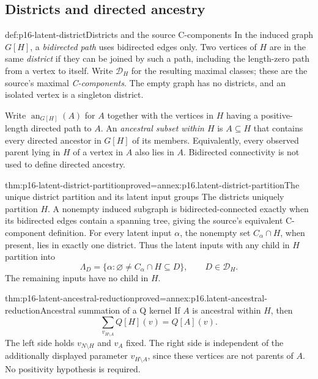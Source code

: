 \subsection{Districts and directed ancestry}

\begin{hbdefinition}{def:p16-latent-district}{Districts and the source C-components}
In the induced graph \(G[H]\), a \emph{bidirected path}
uses bidirected edges only. Two vertices of \(H\) are in the
same \emph{district} if they can be joined by such a path, including
the length-zero path from a vertex to itself. Write \(\mathcal D_H\)
for the resulting maximal classes; these are the source's maximal
\emph{C-components}. The empty graph has no districts, and an
isolated vertex is a singleton district.

Write \(\operatorname{an}_{G[H]}(A)\) for \(A\) together with
the vertices in \(H\) having a positive-length directed path to \(A\).
An \emph{ancestral subset within \(H\)} is \(A\subseteq H\)
that contains every directed ancestor in \(G[H]\) of its members.
Equivalently, every observed parent lying in \(H\) of a vertex
in \(A\) also lies in \(A\). Bidirected connectivity is not
used to define directed ancestry.
\end{hbdefinition}

\begin{hblemma}{thm:p16-latent-district-partition}{proved=annex:p16.latent-district-partition}{The unique district partition and its latent input groups}
The districts uniquely partition \(H\). A nonempty induced subgraph
is bidirected-connected exactly when its bidirected edges contain a
spanning tree, giving the source's equivalent C-component definition.
For every latent input \(\alpha\), the nonempty set
\(C_\alpha\cap H\), when present, lies in exactly one district.
Thus the latent inputs with any child in \(H\) partition into
\[
 \Lambda_D=\{\alpha:\varnothing\ne C_\alpha\cap H\subseteq D\},
 \qquad D\in\mathcal D_H.
\]
The remaining inputs have no child in \(H\).
\end{hblemma}

\begin{hbtheorem}{thm:p16-latent-ancestral-reduction}{proved=annex:p16.latent-ancestral-reduction}{Ancestral summation of a Q kernel}
If \(A\) is ancestral within \(H\), then
\[
 \sum_{v_{H\setminus A}}Q[H](v)=Q[A](v).
\]
The left side holds \(v_{N\setminus H}\) and \(v_A\) fixed.
The right side is independent of the additionally displayed parameter
\(v_{H\setminus A}\), since these vertices are not parents of
\(A\). No positivity hypothesis is required.
\end{hbtheorem}

